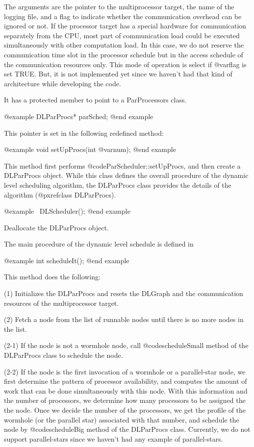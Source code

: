 The arguments are the pointer to the multiprocessor target, the name of the
logging file, and a flag to indicate whether the communication overhead
can be ignored or not. If the processor target has a special hardware for
communication separately from the CPU, most part of communication load
could be executed simultaneously with other computation load. In this case,
we do not reserve the communication time slot in the processor schedule
but in the access schedule of the communication resources only. This mode
of operation is select if @var{flag} is set TRUE. But, it is not
implemented yet since we haven't had that kind of architecture while
developing the code.

It has a protected member to point to a ParProcessors class.

@example
DLParProcs* parSched;
@end example

This pointer is set in the following redefined method:

@example
void setUpProcs(int @var{num});
@end example

This method first performs @code{ParScheduler::setUpProcs}, and then
create a DLParProcs object. While this class defines the overall
procedure of the dynamic level scheduling algorithm, the DLParProcs class
provides the details of the algorithm (@pxref{class DLParProcs}). 

@example
~DLScheduler();
@end example

Deallocate the DLParProcs object.

The main procedure of the dynamic level schedule is defined in

@example
int scheduleIt();
@end example

This method does the following:

(1) Initializes the DLParProcs and resets the DLGraph and
the communication resources of the multiprocessor target.

(2) Fetch a node from the list of runnable nodes until there is no more nodes
in the list.

(2-1) If the node is not a wormhole node, call @code{scheduleSmall} method
of the DLParProcs class to schedule the node.

(2-2) If the node is the first invocation of a wormhole or a parallel-star
node, we first determine the pattern of processor availability, and computes
the amount of work that can be done simultaneously with this node. With
this information and the number of processors, we determine how many
processors to be assigned the the node. Once we decide the number of the
processors, we get the profile of the wormhole (or the parallel star)
associated with that number, and schedule the node by @code{scheduleBig}
method of the DLParProcs class. Currently, we do not support parallel-stars
since we haven't had any example of parallel-stars.

